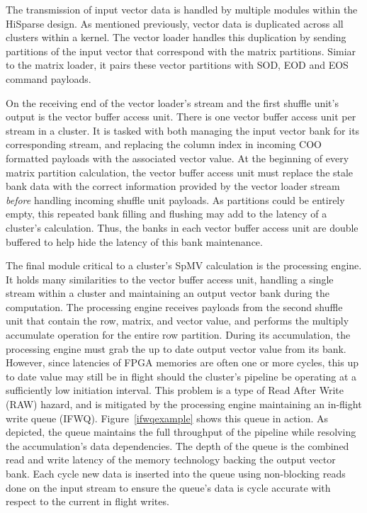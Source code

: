 The transmission of input vector data is handled by multiple modules within the HiSparse design. As mentioned previously, vector data is duplicated across all clusters within a kernel. The vector loader handles this duplication by sending partitions of the input vector that correspond with the matrix partitions. Simiar to the matrix loader, it pairs these vector partitions with SOD, EOD and EOS command payloads. 

On the receiving end of the vector loader's stream and the first shuffle unit's output is the vector buffer access unit. There is one vector buffer access unit per stream in a cluster. It is tasked with both managing the input vector bank for its corresponding stream, and replacing the column index in incoming COO formatted payloads with the associated vector value. At the beginning of every matrix partition calculation, the vector buffer access unit must replace the stale bank data with the correct information provided by the vector loader stream \textit{before} handling incoming shuffle unit payloads. As partitions could be entirely empty, this repeated bank filling and flushing may add to the latency of a cluster's calculation. Thus, the banks in each vector buffer access unit are double buffered to help hide the latency of this bank maintenance.


The final module critical to a cluster's SpMV calculation is the processing engine. It holds many similarities to the vector buffer access unit, handling a single stream within a cluster and maintaining an output vector bank during the computation. The processing engine receives payloads from the second shuffle unit that contain the row, matrix, and vector value, and performs the multiply accumulate operation for the entire row partition. During its accumulation, the processing engine must grab the up to date output vector value from its bank. However, since latencies of FPGA memories are often one or more cycles, this up to date value may still be in flight should the cluster's pipeline be operating at a sufficiently low initiation interval. This problem is a type of Read After Write (RAW) hazard, and is mitigated by the processing engine maintaining an in-flight write queue (IFWQ). Figure~\ref{ifwqexample} shows this queue in action. As depicted, the queue maintains the full throughput of the pipeline while resolving the accumulation's data dependencies. The depth of the queue is the combined read and write latency of the memory technology backing the output vector bank. Each cycle new data is inserted into the queue using non-blocking reads done on the input stream to ensure the queue's data is cycle accurate with respect to the current in flight writes. 

